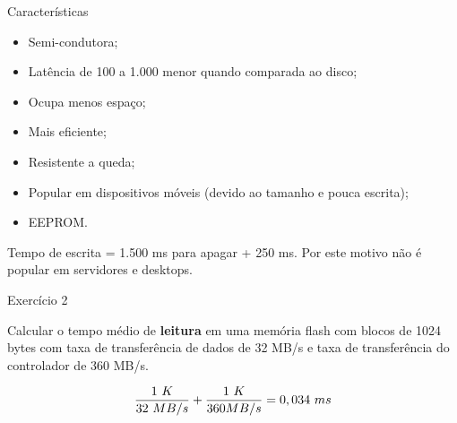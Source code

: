 \begin{frame}{Características}
\begin{itemize}
\item Semi-condutora;
\item Latência de 100 a 1.000 menor quando comparada ao disco;
\item Ocupa menos espaço;
\item Mais eficiente;
\item Resistente a queda;
\item Popular em dispositivos móveis (devido ao tamanho e pouca escrita);
\item EEPROM.
\end{itemize}

Tempo de escrita = 1.500 ms para apagar + 250 ms. Por este motivo não
é popular em servidores e desktops.

\end{frame}

\begin{frame}{Exercício 2} 

  Calcular o tempo médio de {\bf leitura} em uma memória flash com blocos de
  1024 bytes com taxa de transferência de dados de 32 MB/s e taxa de
  transferência do controlador de 360 MB/s.

\pause

$${1\ K \over 32\ MB/s}+{1\ K \over 360 MB/s} = 0,034\ ms$$

\end{frame}





